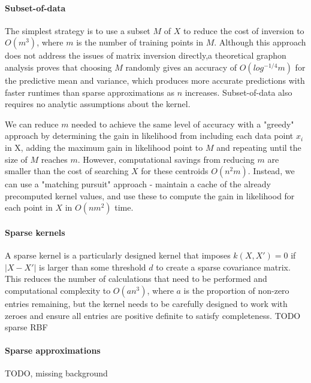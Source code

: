 \documentclass[10pt]{article}
\begin{document}
\paragraph{Subset-of-data}
The simplest strategy is to use a subset $M$ of $X$ to reduce the cost of inversion to $O(m^3)$, where $m$ is the number of training points in $M$. Although this approach does not address the issues of matrix inversion directly,a theoretical graphon analysis proves that choosing $M$ randomly gives an accuracy of $O(log^{-1/4}m)$ for the predictive mean and variance, which produces more accurate predictions with faster runtimes than sparse approximations as $n$ increases. \cite{random-subsampling} Subset-of-data also requires no analytic assumptions about the kernel.


We can reduce $m$ needed to achieve the same level of accuracy with a "greedy" approach by determining the gain in likelihood from including each data point $x_i$ in X, adding the maximum gain in likelihood point to $M$ and repeating until the size of $M$ reaches $m$. However, computational savings from reducing $m$ are smaller than the cost of searching $X$ for these centroids $O(n^2m)$. Instead, we can use a "matching pursuit" approach - maintain a cache of the already precomputed kernel values, and use these to compute the gain in likelihood for each point in $X$ in $O(nm^2)$ time. \cite{matching-pursuit}

\paragraph{Sparse kernels}
A sparse kernel is a particularly designed kernel that imposes $k(X,X') = 0$ if $|X - X'|$ is larger than some threshold $d$ to create a sparse covariance matrix. This reduces the number of calculations that need to be performed and computational complexity to $O(an^3)$, where $a$ is the proportion of non-zero entries remaining, but the kernel needs to be carefully designed to work with zeroes and ensure all entries are positive definite to satisfy completeness. TODO sparse RBF

\paragraph{Sparse approximations}
TODO, missing background
\end{document}
